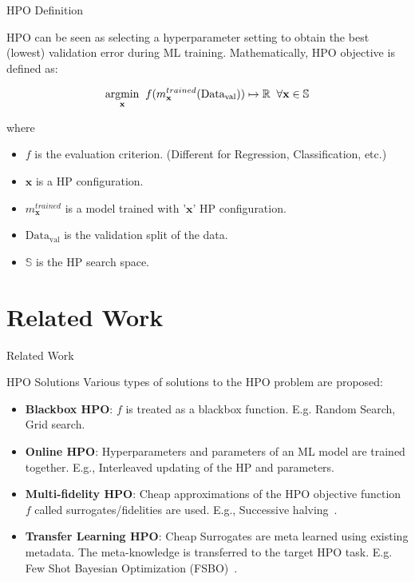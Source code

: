 \documentclass{beamer}
\begin{document}
\begin{frame}[t]{HPO Definition}

HPO can be seen as selecting a hyperparameter setting to obtain the best (lowest) validation error during ML training.
Mathematically,  HPO objective is defined as:

$$
\underset{\rm \textbf{x}}{\rm argmin} \;\; f(m^{trained}_{\textbf{x}}(\textrm{Data}_{\textrm{val}})) \mapsto \mathbb{R}  \;\;  \forall \textbf{x} \in \mathbb{S}
$$

where
\begin{itemize}
\item $f$ is the evaluation criterion. (Different for Regression,  Classification, etc.)
\item $\textbf{x}$ is a HP configuration.
\item $m^{trained}_{\textbf{x}}$ is a model trained with '$\textbf{x}$' HP configuration.
\item $\textrm{Data}_{\textrm{val}}$ is the validation split of the data.
\item $\mathbb{S}$ is the HP search space.
\end{itemize}

\end{frame}

\section{Related Work}

\begin{frame}

\centering
\LARGE{Related Work}

\end{frame}

\begin{frame}[t]{HPO Solutions}
Various types of solutions to the HPO problem are proposed:
\begin{itemize}
\item \textbf{Blackbox HPO}: $f$ is treated as a blackbox function. E.g. Random Search, Grid search.
\item \textbf{Online HPO}: Hyperparameters and parameters of an ML model are trained together. E.g., Interleaved updating of the HP and parameters. 
\item \textbf{Multi-fidelity HPO}: Cheap approximations of the HPO objective function $f$ called surrogates/fidelities are used.
E.g., Successive halving~\cite{successivehalving}.
\item \textbf{Transfer Learning HPO}: Cheap Surrogates are meta learned using existing metadata.
The meta-knowledge is transferred to the target HPO task. 
E.g.  Few Shot Bayesian Optimization (FSBO)~\cite{fsbopaper}.
\end{itemize}
\end{frame}
\end{document}
